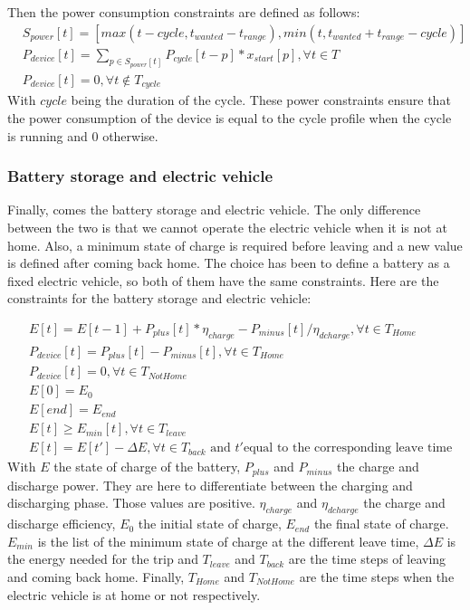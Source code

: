 Then the power consumption constraints are defined as follows:
\begin{align}
    &S_{power}[t] = [max(t-cycle, t_{wanted}-t_{range}), min(t, t_{wanted}+t_{range}-cycle)] \\
    &P_{device}[t] = \sum_{p \in S_{power}[t]} P_{cycle}[t-p] * x_{start}[p], \forall t \in T \\
    &P_{device}[t] = 0, \forall t \notin T_{cycle} 
\end{align}
With $cycle$ being the duration of the cycle. These power constraints ensure that the power consumption of the device is equal to the cycle profile when the cycle is running and 0 otherwise.

\subsubsection{Battery storage and electric vehicle}

Finally, comes the battery storage and electric vehicle. The only difference between the two is that we cannot operate the electric vehicle when it is not at home. Also, a minimum state of charge is required before leaving and a new value is defined after coming back home. The choice has been to define a battery as a fixed electric vehicle, so both of them have the same constraints. Here are the constraints for the battery storage and electric vehicle:

        
\begin{align}
    &E[t] = E[t-1] + P_{plus}[t] * \eta_{charge} - P_{minus}[t] / \eta_{dcharge}, \forall t \in T_{Home} \\
    &P_{device}[t] = P_{plus}[t] - P_{minus}[t], \forall t \in T_{Home} \\
    &P_{device}[t] = 0, \forall t \in T_{NotHome} \\
    &E[0] = E_0 \\
    &E[end] = E_{end} \\
    &E[t] \geq E_{min}[t], \forall t \in T_{leave} \\
    &E[t] = E[t'] - \Delta E, \forall t \in T_{back} \text{ and } t' \text{equal to the corresponding leave time}
\end{align}
With $E$ the state of charge of the battery, $P_{plus}$ and $P_{minus}$ the charge and discharge power. They are here to differentiate between the charging and discharging phase. Those values are positive. $\eta_{charge}$ and $\eta_{dcharge}$ the charge and discharge efficiency, $E_0$ the initial state of charge, $E_{end}$ the final state of charge. $E_{min}$ is the list of the minimum state of charge at the different leave time, $\Delta E$ is the energy needed for the trip and $T_{leave}$ and $T_{back}$ are the time steps of leaving and coming back home. Finally, $T_{Home}$ and $T_{NotHome}$ are the time steps when the electric vehicle is at home or not respectively. 


